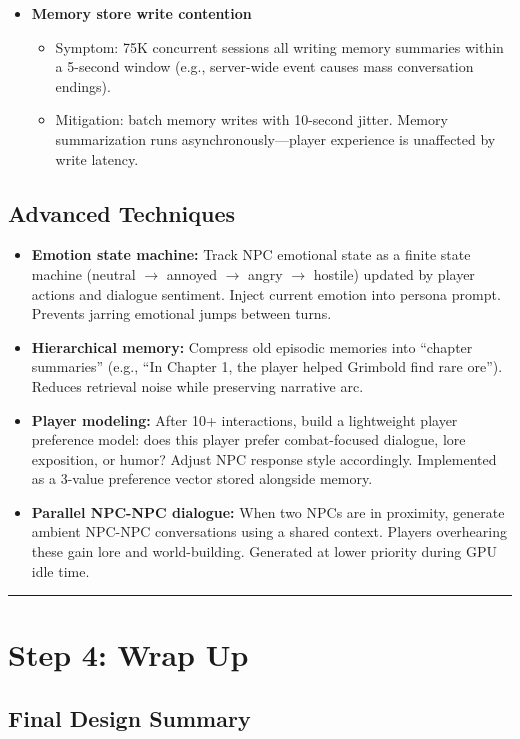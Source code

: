 \begin{itemize}
  \item \textbf{Memory store write contention}
  \begin{itemize}
    \item Symptom: 75K concurrent sessions all writing memory summaries within a 5-second window (e.g., server-wide event causes mass conversation endings).
    \item Mitigation: batch memory writes with 10-second jitter. Memory summarization runs asynchronously---player experience is unaffected by write latency.
  \end{itemize}
\end{itemize}

\subsection*{Advanced Techniques}
\begin{itemize}
  \item \textbf{Emotion state machine:} Track NPC emotional state as a finite state machine (neutral $\rightarrow$ annoyed $\rightarrow$ angry $\rightarrow$ hostile) updated by player actions and dialogue sentiment. Inject current emotion into persona prompt. Prevents jarring emotional jumps between turns.
  \item \textbf{Hierarchical memory:} Compress old episodic memories into ``chapter summaries'' (e.g., ``In Chapter 1, the player helped Grimbold find rare ore''). Reduces retrieval noise while preserving narrative arc.
  \item \textbf{Player modeling:} After 10+ interactions, build a lightweight player preference model: does this player prefer combat-focused dialogue, lore exposition, or humor? Adjust NPC response style accordingly. Implemented as a 3-value preference vector stored alongside memory.
  \item \textbf{Parallel NPC-NPC dialogue:} When two NPCs are in proximity, generate ambient NPC-NPC conversations using a shared context. Players overhearing these gain lore and world-building. Generated at lower priority during GPU idle time.
\end{itemize}

\bigskip\hrule\bigskip

\section*{Step 4: Wrap Up}

\subsection*{Final Design Summary}

